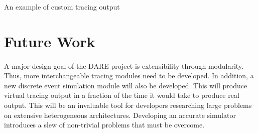 \documentclass{article}
\begin{document}
An example of custom tracing output 

\section{Future Work}
\paragraph{}
A major design goal of the DARE project is extensibility through modularity. Thus, more interchangeable tracing modules need to be developed. In addition, a new discrete event simulation module will also be developed. This will produce virtual tracing output in a fraction of the time it would take to produce real output. This will be an invaluable tool for developers researching large problems on extensive heterogeneous architectures. Developing an accurate simulator introduces a slew of non-trivial problems that must be overcome.
\end{document}
